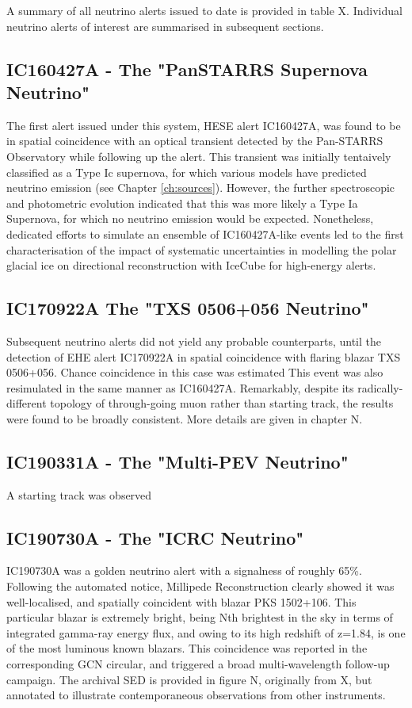 A summary of all neutrino alerts issued to date is provided in table X. Individual neutrino alerts of interest are summarised in subsequent sections. 

\subsection{IC160427A - The "PanSTARRS Supernova Neutrino"}

The first alert issued under this system, HESE alert IC160427A, was found to be in spatial coincidence with an optical transient detected by the Pan-STARRS Observatory while following up the alert. This transient was initially tentaively classified as a Type Ic supernova, for which various models have predicted neutrino emission (see Chapter \ref{ch:sources}).  However, the further spectroscopic and photometric evolution indicated that this was  more likely a Type Ia Supernova, for which no neutrino emission would be expected. Nonetheless, dedicated efforts to simulate an ensemble of IC160427A-like events led to the first characterisation of the impact of systematic uncertainties in modelling the polar glacial ice on directional reconstruction with IceCube for high-energy alerts. 

\subsection{IC170922A The "TXS 0506+056 Neutrino"}
Subsequent neutrino alerts did not yield any probable counterparts, until the detection of EHE alert IC170922A in spatial coincidence with flaring blazar TXS 0506+056. Chance coincidence in this case was estimated  This event was also resimulated in the same manner as IC160427A. Remarkably, despite its radically-different topology of through-going muon rather than starting track, the results were found to be broadly consistent. More details are given in chapter N.

\subsection{IC190331A - The "Multi-PEV Neutrino"}

A starting track was observed 

\subsection{IC190730A - The "ICRC Neutrino"}

IC190730A was a golden neutrino alert with a signalness of roughly 65\%. Following the automated notice, Millipede Reconstruction clearly showed it was well-localised, and spatially coincident with blazar PKS 1502+106. This particular blazar is extremely bright, being Nth brightest in the sky in terms of integrated gamma-ray energy flux, and owing to its high redshift of z=1.84, is one of the most luminous known blazars. This coincidence was reported in the corresponding GCN circular, and triggered a broad multi-wavelength follow-up campaign. The archival SED is provided in figure N, originally from X, but annotated to illustrate contemporaneous observations from other instruments.

